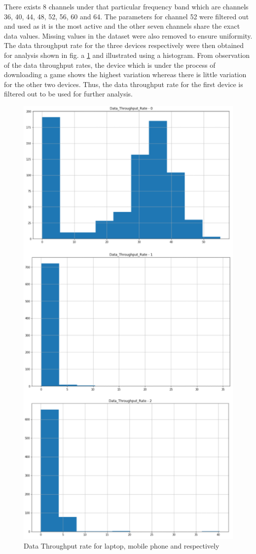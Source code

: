 There exists 8 channels under that particular frequency band which are channels 36, 40, 44, 48, 52, 56, 60 and 64. The parameters for channel 52 were filtered out and used as it is the most active and the other seven channels share the exact data values. Missing values in the dataset were also removed to ensure uniformity. The data throughput rate for the three devices  respectively were then obtained for analysis shown in fig. a \ref{fig_t3} and illustrated using a histogram. From observation of the data throughput rates, the device which is under the process of downloading a game shows the highest variation whereas there is little variation for the other two devices. Thus, the data throughput rate for the first device is filtered out to be used for further analysis. 

\begin{figure}[ht]
    \centering
    \includegraphics[scale=0.9]{pages/Chapter4/Chapter 4 Images/Throughput.PNG}
    \caption{Data Throughput rate for laptop, mobile phone and respectively}
    \label{fig_t3}
\end{figure}

